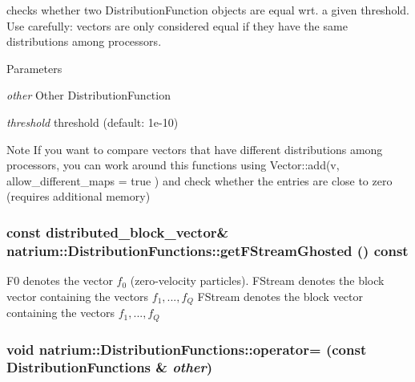 checks whether two DistributionFunction objects are equal wrt. a given threshold. Use carefully: vectors are only considered equal if they have the same distributions among processors. 
\begin{DoxyParams}{Parameters}
\item[{\em other}]Other DistributionFunction \item[{\em threshold}]threshold (default: 1e-\/10) \end{DoxyParams}
\begin{DoxyNote}{Note}
If you want to compare vectors that have different distributions among processors, you can work around this functions using Vector::add(v, allow\_\-different\_\-maps = true ) and check whether the entries are close to zero (requires additional memory) 
\end{DoxyNote}
\hypertarget{classnatrium_1_1DistributionFunctions_acc97fc1ac5185c94d8d15024c168b6c2}{
\subsubsection[{getFStreamGhosted}]{\setlength{\rightskip}{0pt plus 5cm}const distributed\_\-block\_\-vector\& natrium::DistributionFunctions::getFStreamGhosted () const}}
\label{classnatrium_1_1DistributionFunctions_acc97fc1ac5185c94d8d15024c168b6c2}


F0 denotes the vector $ f_0 $ (zero-\/velocity particles). FStream denotes the block vector containing the vectors $ f_1, ..., f_Q $ FStream denotes the block vector containing the vectors $ f_1, ..., f_Q $ \hypertarget{classnatrium_1_1DistributionFunctions_a5e61cb3ba258cf0958e1557061ed31b9}{
\subsubsection[{operator=}]{\setlength{\rightskip}{0pt plus 5cm}void natrium::DistributionFunctions::operator= (const {\bf DistributionFunctions} \& {\em other})}}
\label{classnatrium_1_1DistributionFunctions_a5e61cb3ba258cf0958e1557061ed31b9}


